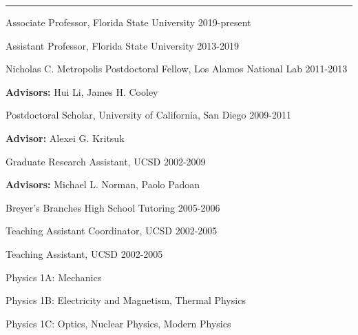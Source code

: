 
\rule[3pt]{384pt}{.1mm}

\medskip
\noindent
Associate Professor, Florida State University
\hfill
2019-present

\medskip
\noindent
Assistant Professor, Florida State University
\hfill
2013-2019

\medskip
\noindent
Nicholas C. Metropolis Postdoctoral Fellow, Los Alamos National Lab
\hfill
2011-2013

{\bf Advisors: } Hui Li, James H. Cooley


\medskip
\noindent
Postdoctoral Scholar, University of California, San Diego
\hfill
2009-2011

{\bf Advisor: } Alexei G. Kritsuk

\medskip
\noindent
Graduate Research Assistant, UCSD
\hfill
2002-2009

{\bf Advisors: }Michael L. Norman, Paolo Padoan 

\medskip
\noindent
Breyer's Branches High School Tutoring
\hfill 2005-2006

\medskip
\noindent
Teaching Assistant Coordinator, UCSD
\hfill 2002-2005

\medskip
\noindent
Teaching Assistant, UCSD
\hfill 2002-2005

Physics 1A: Mechanics

Physics 1B: Electricity and Magnetism, Thermal Physics

Physics 1C: Optics, Nuclear Physics, Modern Physics


